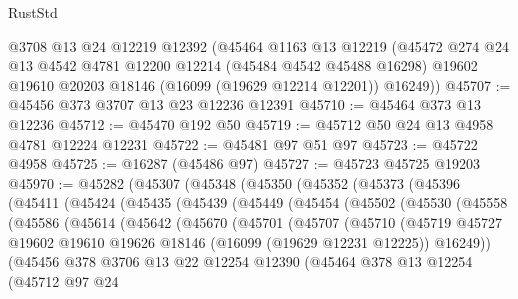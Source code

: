 \begin{lexlean}{RustStd}
\begin{coremodule}
    @3708
    @13
    @24
    @12219
    @12392
    (@45464
      @1163
      @13
      @12219
      (@45472
        @274
        @24
        @13
        @4542
        @4781
        @12200
        @12214
        (@45484 @4542 @45488 @16298)
        @19602
        @19610
        @20203
        @18146
        (@16099 (@19629 @12214 @12201))
        @16249))
@45707 := @45456 @373 @3707 @13 @23 @12236 @12391
@45710 := @45464 @373 @13 @12236
@45712 := @45470 @192 @50
@45719 := @45712 @50 @24 @13 @4958 @4781 @12224 @12231
@45722 := @45481 @97 @51 @97
@45723 := @45722 @4958
@45725 := @16287 (@45486 @97)
@45727 := @45723 @45725 @19203
@45970 := @45282
    (@45307
      (@45348
        (@45350
          (@45352
            (@45373
              (@45396
                (@45411
                  (@45424
                    (@45435
                      (@45439
                        (@45449
                          (@45454
                            (@45502
                              (@45530
                                (@45558
                                  (@45586
                                    (@45614
                                      (@45642
                                        (@45670
                                          (@45701
                                            (@45707
                                              (@45710
                                                (@45719
                                                  @45727
                                                  @19602
                                                  @19610
                                                  @19626
                                                  @18146
                                                  (@16099 (@19629 @12231 @12225))
                                                  @16249))
                                              (@45456
                                                @378
                                                @3706
                                                @13
                                                @22
                                                @12254
                                                @12390
                                                (@45464
                                                  @378
                                                  @13
                                                  @12254
                                                  (@45712
                                                    @97
                                                    @24

\end{coremodule}
\end{lexlean}
